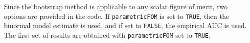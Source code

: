 \documentclass[
]{book}
\newenvironment{Shaded}{\begin{snugshade}}{\end{snugshade}}
\newcommand{\CommentTok}[1]{\textcolor[rgb]{0.56,0.35,0.01}{\textit{#1}}}
\newcommand{\ControlFlowTok}[1]{\textcolor[rgb]{0.13,0.29,0.53}{\textbf{#1}}}
\newcommand{\DataTypeTok}[1]{\textcolor[rgb]{0.13,0.29,0.53}{#1}}
\newcommand{\DecValTok}[1]{\textcolor[rgb]{0.00,0.00,0.81}{#1}}
\newcommand{\KeywordTok}[1]{\textcolor[rgb]{0.13,0.29,0.53}{\textbf{#1}}}
\newcommand{\NormalTok}[1]{#1}
\newcommand{\OperatorTok}[1]{\textcolor[rgb]{0.81,0.36,0.00}{\textbf{#1}}}
\newcommand{\StringTok}[1]{\textcolor[rgb]{0.31,0.60,0.02}{#1}}
\begin{document}
\begin{Shaded}
\end{Shaded}

Since the bootstrap method is applicable to any scalar figure of merit, two options are provided in the code. If \texttt{parametricFOM} is set to \texttt{TRUE}, then the binormal model estimate is used, and if set to \texttt{FALSE}, the empirical AUC is used. The first set of results are obtained with \texttt{parametricFOM} set to \texttt{TRUE}.
\end{document}
